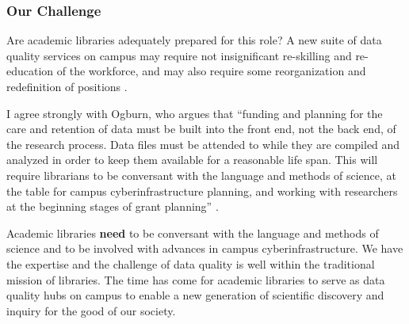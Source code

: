 \documentclass[jou,12pt]{apa6}
\begin{document}
%

\subsubsection{Our Challenge}

Are academic libraries adequately prepared for this role?  A new suite
of data quality services on campus may require not insignificant
re-skilling and re-education of the workforce, and may also require
some reorganization and redefinition of positions \cite{jisc:deluge}.

%

%

I agree strongly with Ogburn, who argues that ``funding and planning
for the care and retention of data must be built into the front end,
not the back end, of the research process. Data files must be attended
to while they are compiled and analyzed in order to keep them
available for a reasonable life span. This will require librarians to
be conversant with the language and methods of science, at the table
for campus cyberinfrastructure planning, and working with researchers
at the beginning stages of grant planning''
\cite{ogburn:imperative}.

Academic libraries \textbf{need} to be conversant with the language
and methods of science and to be involved with advances in campus
cyberinfrastructure. We have the expertise and the challenge of data
quality is well within the traditional mission of libraries. The time
has come for academic libraries to serve as data quality hubs on
campus to enable a new generation of scientific discovery and inquiry
for the good of our society.

%

\printbibliography
\end{document}
